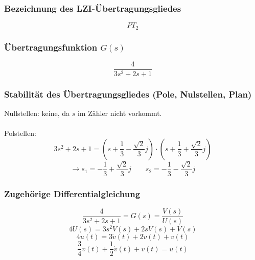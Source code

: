 \documentclass[a4paper,10pt,fleqn]{article}
\begin{document}
\subsubsection*{Bezeichnung des LZI-Übertragungsgliedes}
\[ PT_2 \]

\subsubsection*{Übertragungsfunktion $G(s)$}
\[ \frac{4}{3 s^2 + 2 s + 1} \]

\subsubsection*{Stabilität des Übertragungsgliedes (Pole, Nulstellen, Plan)}
Nullstellen: keine, da $s$ im Zähler nicht vorkommt. \\\\
Polstellen: 
\[ 3 s^2 + 2 s + 1 = \left(s + \frac{1}{3} - \frac{\sqrt{2}}{3}j\right) \cdot \left(s + \frac{1}{3} + \frac{\sqrt{2}}{3}j\right) \]
\[ \rightarrow s_1 = -\frac{1}{3} + \frac{\sqrt{2}}{3}j \qquad s_2 = -\frac{1}{3} - \frac{\sqrt{2}}{3}j \]
\begin{figure}[h!]
    \centering
\end{figure}

\subsubsection*{Zugehörige Differentialgleichung}
\[ \frac{4}{3 s^2 + 2 s + 1} = G(s) = \frac{V(s)}{U(s)} \]
\[ 4 U(s) = 3 s^2 V(s) + 2 s V(s) + V(s) \]
\[ 4 u(t) = 3 \ddot{v}(t) + 2 \dot{v}(t) + v(t) \]
\[ \frac{3}{4} \ddot{v}(t) + \frac{1}{2} \dot{v}(t) + v(t) = u(t) \]
\end{document}
